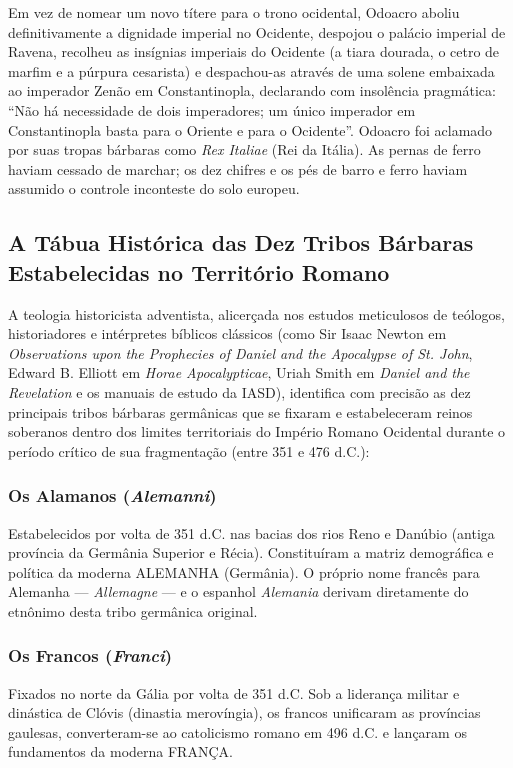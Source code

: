Em vez de nomear um novo títere para o trono ocidental, Odoacro aboliu definitivamente a dignidade imperial no Ocidente, despojou o palácio imperial de Ravena, recolheu as insígnias imperiais do Ocidente (a tiara dourada, o cetro de marfim e a púrpura cesarista) e despachou-as através de uma solene embaixada ao imperador Zenão em Constantinopla, declarando com insolência pragmática: ``Não há necessidade de dois imperadores; um único imperador em Constantinopla basta para o Oriente e para o Ocidente''. Odoacro foi aclamado por suas tropas bárbaras como \textit{Rex Italiae} (Rei da Itália). As pernas de ferro haviam cessado de marchar; os dez chifres e os pés de barro e ferro haviam assumido o controle inconteste do solo europeu.


\subsection{A Tábua Histórica das Dez Tribos Bárbaras Estabelecidas no Território Romano}


A teologia historicista adventista, alicerçada nos estudos meticulosos de teólogos, historiadores e intérpretes bíblicos clássicos (como Sir Isaac Newton em \textit{Observations upon the Prophecies of Daniel and the Apocalypse of St. John}, Edward B. Elliott em \textit{Horae Apocalypticae}, Uriah Smith em \textit{Daniel and the Revelation} e os manuais de estudo da IASD), identifica com precisão as dez principais tribos bárbaras germânicas que se fixaram e estabeleceram reinos soberanos dentro dos limites territoriais do Império Romano Ocidental durante o período crítico de sua fragmentação (entre 351 e 476 d.C.):


\subsubsection*{Os Alamanos (\textit{Alemanni})}
Estabelecidos por volta de 351 d.C. nas bacias dos rios Reno e Danúbio (antiga província da Germânia Superior e Récia). Constituíram a matriz demográfica e política da moderna ALEMANHA (Germânia). O próprio nome francês para Alemanha — \textit{Allemagne} — e o espanhol \textit{Alemania} derivam diretamente do etnônimo desta tribo germânica original.


\subsubsection*{Os Francos (\textit{Franci})}
Fixados no norte da Gália por volta de 351 d.C. Sob a liderança militar e dinástica de Clóvis (dinastia merovíngia), os francos unificaram as províncias gaulesas, converteram-se ao catolicismo romano em 496 d.C. e lançaram os fundamentos da moderna FRANÇA.


